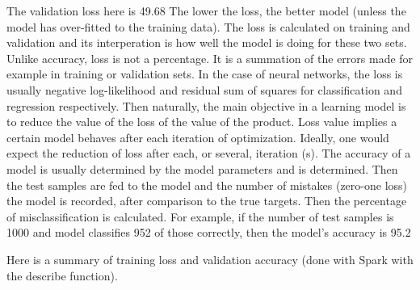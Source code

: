 \documentclass{acmtog} %
\begin{document}
\begin{itemize}
The validation loss here is 49.68%
The lower the loss, the better model (unless the model has over-fitted to the training data). The loss is calculated on training and validation and its interperation is how well the model is doing for these two sets. Unlike accuracy, loss is not a percentage. It is a summation of the errors made for example in training or validation sets.
In the case of neural networks, the loss is usually negative log-likelihood and residual sum of squares for classification and regression respectively. Then naturally, the main objective in a learning model is to reduce the value of the loss of the value of the product.
Loss value implies a certain model behaves after each iteration of optimization. Ideally, one would expect the reduction of loss after each, or several, iteration (s).
The accuracy of a model is usually determined by the model parameters and is determined. Then the test samples are fed to the model and the number of mistakes (zero-one loss) the model is recorded, after comparison to the true targets. Then the percentage of misclassification is calculated.
For example, if the number of test samples is 1000 and model classifies 952 of those correctly, then the model's accuracy is 95.2%

Here is a summary of training loss and validation accuracy (done with Spark with the describe function).


\begin{table}[H]
\label{tab:training_loss_a}
\end{table}


\begin{table}[H]
\label{tab:valid_loss_b}
\end{table}


\end{itemize}
\end{document}
